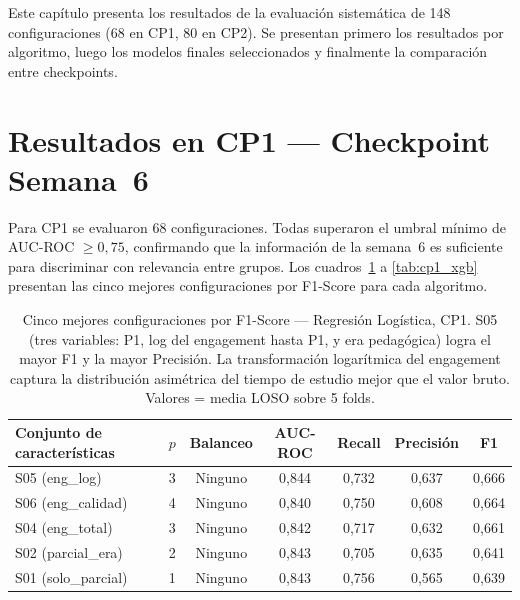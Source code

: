 \documentclass[12pt, letterpaper, openany]{report}
\begin{document}
Este capítulo presenta los resultados de la evaluación sistemática de 148 configuraciones (68 en CP1, 80 en CP2). Se presentan primero los resultados por algoritmo, luego los modelos finales seleccionados y finalmente la comparación entre checkpoints.

\section{Resultados en CP1 --- Checkpoint Semana~6}

Para CP1 se evaluaron 68 configuraciones. Todas superaron el umbral mínimo de AUC-ROC $\geq 0{,}75$, confirmando que la información de la semana~6 es suficiente para discriminar con relevancia entre grupos. Los cuadros~\ref{tab:cp1_lr} a \ref{tab:cp1_xgb} presentan las cinco mejores configuraciones por F1-Score para cada algoritmo.

\begin{table}[!htbp]
  \centering
  \caption{Cinco mejores configuraciones por F1-Score --- Regresión Logística, CP1. S05 (tres variables: P1, log del engagement hasta P1, y era pedagógica) logra el mayor F1 y la mayor Precisión. La transformación logarítmica del engagement captura la distribución asimétrica del tiempo de estudio mejor que el valor bruto. Valores = media LOSO sobre 5 folds.}
  \label{tab:cp1_lr}
  \small
  \begin{tabular}{lcccccc}
    \toprule
    Conjunto de características & $p$ & Balanceo & AUC-ROC & Recall & Precisión & F1 \\
    \midrule
    S05 (eng\_log)      & 3 & Ninguno & 0,844 & 0,732 & 0,637 & 0,666 \\
    S06 (eng\_calidad)  & 4 & Ninguno & 0,840 & 0,750 & 0,608 & 0,664 \\
    S04 (eng\_total)    & 3 & Ninguno & 0,842 & 0,717 & 0,632 & 0,661 \\
    S02 (parcial\_era)  & 2 & Ninguno & 0,843 & 0,705 & 0,635 & 0,641 \\
    S01 (solo\_parcial) & 1 & Ninguno & 0,843 & 0,756 & 0,565 & 0,639 \\
    \bottomrule
  \end{tabular}
\end{table}
\end{document}
